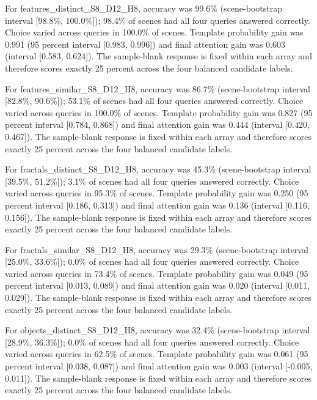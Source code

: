 \documentclass[11pt]{article}
\begin{document}
For features\_\allowbreak{}distinct\_\allowbreak{}S8\_\allowbreak{}D12\_\allowbreak{}H8, accuracy was 99.6\% (scene-bootstrap interval [98.8\%, 100.0\%]); 98.4\% of scenes had all four queries answered correctly. Choice varied across queries in 100.0\% of scenes. Template probability gain was 0.991 (95 percent interval [0.983, 0.996]) and final attention gain was 0.603 (interval [0.583, 0.624]). The sample-blank response is fixed within each array and therefore scores exactly 25 percent across the four balanced candidate labels.

For features\_\allowbreak{}similar\_\allowbreak{}S8\_\allowbreak{}D12\_\allowbreak{}H8, accuracy was 86.7\% (scene-bootstrap interval [82.8\%, 90.6\%]); 53.1\% of scenes had all four queries answered correctly. Choice varied across queries in 100.0\% of scenes. Template probability gain was 0.827 (95 percent interval [0.784, 0.868]) and final attention gain was 0.444 (interval [0.420, 0.467]). The sample-blank response is fixed within each array and therefore scores exactly 25 percent across the four balanced candidate labels.

For fractals\_\allowbreak{}distinct\_\allowbreak{}S8\_\allowbreak{}D12\_\allowbreak{}H8, accuracy was 45.3\% (scene-bootstrap interval [39.5\%, 51.2\%]); 3.1\% of scenes had all four queries answered correctly. Choice varied across queries in 95.3\% of scenes. Template probability gain was 0.250 (95 percent interval [0.186, 0.313]) and final attention gain was 0.136 (interval [0.116, 0.156]). The sample-blank response is fixed within each array and therefore scores exactly 25 percent across the four balanced candidate labels.

For fractals\_\allowbreak{}similar\_\allowbreak{}S8\_\allowbreak{}D12\_\allowbreak{}H8, accuracy was 29.3\% (scene-bootstrap interval [25.0\%, 33.6\%]); 0.0\% of scenes had all four queries answered correctly. Choice varied across queries in 73.4\% of scenes. Template probability gain was 0.049 (95 percent interval [0.013, 0.089]) and final attention gain was 0.020 (interval [0.011, 0.029]). The sample-blank response is fixed within each array and therefore scores exactly 25 percent across the four balanced candidate labels.

For objects\_\allowbreak{}distinct\_\allowbreak{}S8\_\allowbreak{}D12\_\allowbreak{}H8, accuracy was 32.4\% (scene-bootstrap interval [28.9\%, 36.3\%]); 0.0\% of scenes had all four queries answered correctly. Choice varied across queries in 62.5\% of scenes. Template probability gain was 0.061 (95 percent interval [0.038, 0.087]) and final attention gain was 0.003 (interval [-0.005, 0.011]). The sample-blank response is fixed within each array and therefore scores exactly 25 percent across the four balanced candidate labels.
\end{document}
